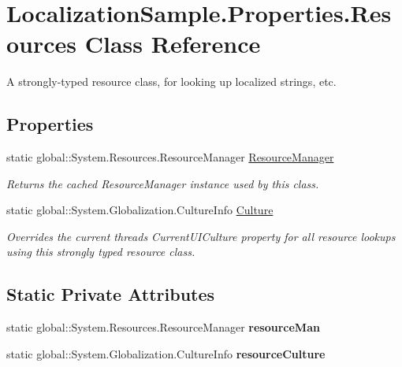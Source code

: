 \hypertarget{class_localization_sample_1_1_properties_1_1_resources}{}\section{Localization\+Sample.\+Properties.\+Resources Class Reference}
\label{class_localization_sample_1_1_properties_1_1_resources}


A strongly-\/typed resource class, for looking up localized strings, etc.  


\subsection*{Properties}
\begin{DoxyCompactItemize}
\item 
static global\+::\+System.\+Resources.\+Resource\+Manager \mbox{\hyperlink{class_localization_sample_1_1_properties_1_1_resources_a55df73946b772c44c69e5f660d4507fc}{Resource\+Manager}}
\begin{DoxyCompactList}\small\item\em Returns the cached Resource\+Manager instance used by this class. \end{DoxyCompactList}\item 
static global\+::\+System.\+Globalization.\+Culture\+Info \mbox{\hyperlink{class_localization_sample_1_1_properties_1_1_resources_a0dc25fd896129a0a3bc93efe0de9280a}{Culture}}
\begin{DoxyCompactList}\small\item\em Overrides the current thread\textquotesingle{}s Current\+U\+I\+Culture property for all resource lookups using this strongly typed resource class. \end{DoxyCompactList}\end{DoxyCompactItemize}
\subsection*{Static Private Attributes}
\begin{DoxyCompactItemize}
\item 
\mbox{\label{class_localization_sample_1_1_properties_1_1_resources_a20f91a30fe5d7e16b0f94406a5af9f86}} 
static global\+::\+System.\+Resources.\+Resource\+Manager {\bfseries resource\+Man}
\item 
\mbox{\label{class_localization_sample_1_1_properties_1_1_resources_afa4aaafb0399e9db813a0e0b74f0daf3}} 
static global\+::\+System.\+Globalization.\+Culture\+Info {\bfseries resource\+Culture}
\end{DoxyCompactItemize}


